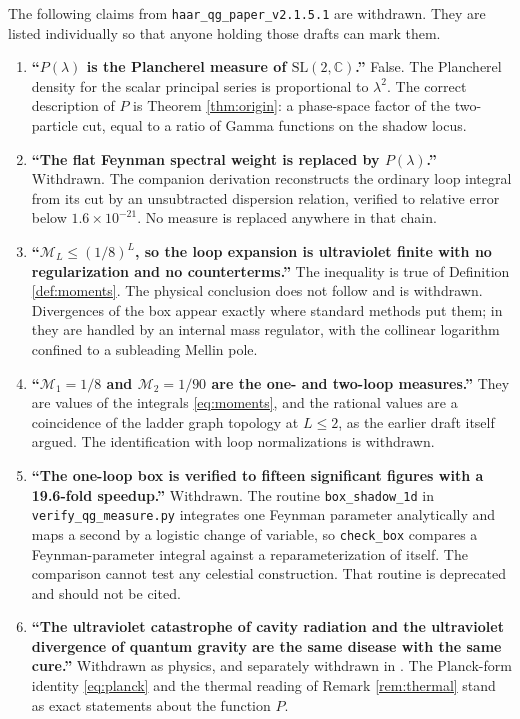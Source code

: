 \documentclass[12pt,a4paper]{article}
\theoremstyle{plain}
\theoremstyle{definition}
\theoremstyle{remark}
\newcommand{\C}{\mathbb{C}}
\newcommand{\cM}{\mathcal{M}}
\begin{document}
The following claims from
\texttt{haar\_qg\_paper\_v2.1.5.1} are withdrawn. They are listed
individually so that anyone holding those drafts can mark them.

\begin{enumerate}
\item \textbf{``$P(\lambda)$ is the Plancherel measure of
$\mathrm{SL}(2,\C)$.''} False. The Plancherel density for the scalar
principal series is proportional to $\lambda^2$. The correct
description of $P$ is Theorem \ref{thm:origin}: a phase-space factor of
the two-particle cut, equal to a ratio of Gamma functions on the shadow
locus.

\item \textbf{``The flat Feynman spectral weight is replaced by
$P(\lambda)$.''} Withdrawn. The companion derivation
\cite{ToupinLoops} reconstructs the ordinary loop integral from its cut
by an unsubtracted dispersion relation, verified to relative error
below $1.6\times10^{-21}$. No measure is replaced anywhere in that
chain.

\item \textbf{``$\cM_L\le(1/8)^L$, so the loop expansion is ultraviolet
finite with no regularization and no counterterms.''} The inequality is
true of Definition \ref{def:moments}. The physical conclusion does not
follow and is withdrawn. Divergences of the box appear exactly where
standard methods put them; in \cite{ToupinLoops} they are handled by an
internal mass regulator, with the collinear logarithm confined to a
subleading Mellin pole.

\item \textbf{``$\cM_1=1/8$ and $\cM_2=1/90$ are the one- and two-loop
measures.''} They are values of the integrals \eqref{eq:moments}, and
the rational values are a coincidence of the ladder graph topology at
$L\le2$, as the earlier draft itself argued. The identification with
loop normalizations is withdrawn.

\item \textbf{``The one-loop box is verified to fifteen significant
figures with a 19.6-fold speedup.''} Withdrawn. The routine
\texttt{box\_shadow\_1d} in \texttt{verify\_qg\_measure.py} integrates
one Feynman parameter analytically and maps a second by a logistic
change of variable, so \texttt{check\_box} compares a Feynman-parameter
integral against a reparameterization of itself. The comparison cannot
test any celestial construction. That routine is deprecated and should
not be cited.

\item \textbf{``The ultraviolet catastrophe of cavity radiation and the
ultraviolet divergence of quantum gravity are the same disease with the
same cure.''} Withdrawn as physics, and separately withdrawn in
\cite{ToupinThermal}. The Planck-form identity \eqref{eq:planck} and
the thermal reading of Remark \ref{rem:thermal} stand as exact
statements about the function $P$.


\end{enumerate}
\end{document}
